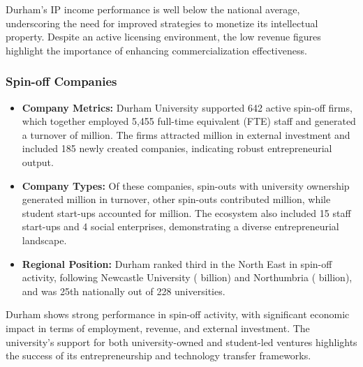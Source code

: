\documentclass[journal,onecolumn, 10pt,draftclsnofoot]{IEEEtran}
\begin{document}
Durham's IP income performance is well below the national average, underscoring the need for improved strategies to monetize its intellectual property. Despite an active licensing environment, the low revenue figures highlight the importance of enhancing commercialization effectiveness.

\subsubsection{Spin-off Companies}

\begin{itemize}
    \item \textbf{Company Metrics:} Durham University supported 642 active spin-off firms, which together employed 5,455 full-time equivalent (FTE) staff and generated a turnover of  million. The firms attracted  million in external investment and included 185 newly created companies, indicating robust entrepreneurial output.
    
    \item \textbf{Company Types:} Of these companies, spin-outs with university ownership generated  million in turnover, other spin-outs contributed  million, while student start-ups accounted for  million. The ecosystem also included 15 staff start-ups and 4 social enterprises, demonstrating a diverse entrepreneurial landscape.
    
    \item \textbf{Regional Position:} Durham ranked third in the North East in spin-off activity, following Newcastle University ( billion) and Northumbria ( billion), and was 25th nationally out of 228 universities.
\end{itemize}



Durham shows strong performance in spin-off activity, with significant economic impact in terms of employment, revenue, and external investment. The university's support for both university-owned and student-led ventures highlights the success of its entrepreneurship and technology transfer frameworks.
\end{document}

